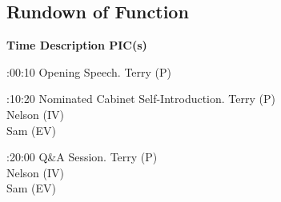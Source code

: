 \subsection{Rundown of Function}

\setupTABLE[c][1][width=1.25in]
\setupTABLE[c][2][width=3.5in]
\setupTABLE[c][3][width=1.25in]
\bTABLE
\bTABLEhead

\bTR\bTH    \bf{Time}
\eTH\bTH    \bf{Description}
\eTH\bTH    \bf{PIC(s)}
\eTH\eTR

\eTABLEhead
\bTABLEbody

\bTR{}:00:10
\eTD\bTD Opening Speech.
\eTD\bTD Terry (P)
\eTD\eTR

\bTR{}:10:20
\eTD\bTD Nominated Cabinet Self-Introduction.
\eTD\bTD Terry (P) \\ Nelson (IV) \\ Sam (EV)
\eTD\eTR

\bTR{}:20:00
\eTD\bTD Q\&A Session.
\eTD\bTD Terry (P) \\ Nelson (IV) \\ Sam (EV)
\eTD\eTR

\eTABLEbody
\eTABLE

\pagebreak
